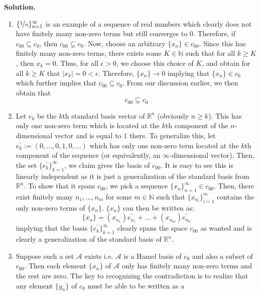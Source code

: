 \documentclass{article}
\begin{document}
    \textbf{Solution.}

    \begin{enumerate}
        \item $\{\nicefrac{1}{n}\}_{n=1}^{\infty}$ is an example of a sequence of real numbers which clearly does not have
            finitely many non-zero terms but still converges to 0. Therefore, if $c_{00} \subseteq c_0$, then $c_{00}\subsetneq c_0$.
            Now, choose an arbitrary $\{x_n\}\in c_{00}$. Since this has finitely many non-zero terms, there exists some
            $K\in\mathbb{N}$ such that for all $k\geq K$, then $x_k = 0$. Thus, for all $\epsilon>0$, we choose this choice
            of $K$, and obtain for all $k\geq K$ that $|x_k| = 0 < \epsilon$. Therefore, $\{x_n\}\to 0$ implying that $\{x_n\}\in c_0$
            which further implies that $c_{00} \subseteq c_0$. From our discussion earlier, we then obtain that
            \[ c_{00} \subsetneq c_0 \]
        \item Let $e_k$ be the $k$th standard basis vector of $\mathbb{R}^n$ (obviously $n\geq k$). This has only one non-zero term
            which is located at the $k$th component of the $n$-dimensional vector and is equal to $1$ there. To generalize this,
            let $e_k^{'} := (0,\hdots,0,1,0,\hdots)$ which has only one non-zero term located at the $k$th component of the sequence
            (or equivalently, an $\infty$-dimensional vector). Then, the set $\{e_k^{'}\}_{k=1}^{\infty}$, we claim gives the basis
            of $c_{00}$. It is easy to see this is linearly independent as it is just a generalization of the standard basis
            from $\mathbb{R}^n$. To show that it spans $c_{00}$, we pick a sequence $\{x_n\}_{n=1}^{\infty}\in c_{00}$. Then,
            there exist finitely many $n_1,\hdots,n_m$ for some $m\in\mathbb{N}$ such that $\{x_{n_i}\}_{i=1}^m$ contains the
            only non-zero terms of $\{x_n\}$. $\{x_n\}$ can then be written as:
            \[ \{x_n\} = (x_{n_1})e_{n_1}^{'} + \hdots + (x_{n_m})e_{n_k}^{'} \]
            implying that the basis $\{e_k^{'}\}_{k=1}^{\infty}$ clearly spans the space $c_{00}$ as wanted and is clearly a
            generalization of the standard basis of $\mathbb{R}^n$.
        \item Suppose such a set $\mathcal{A}$ exists i.e. $\mathcal{A}$ is a Hamel basis of $c_0$ and also a subset of $c_{00}$.
            Then each element $\{x_n\}$ of $\mathcal{A}$ only has finitely many non-zero terms and the rest are zero. The key to
            recognizing the contradiction is to realize that any element $\{y_n\}$ of $c_0$ must be able to be written as a 

\end{enumerate}
\end{document}
